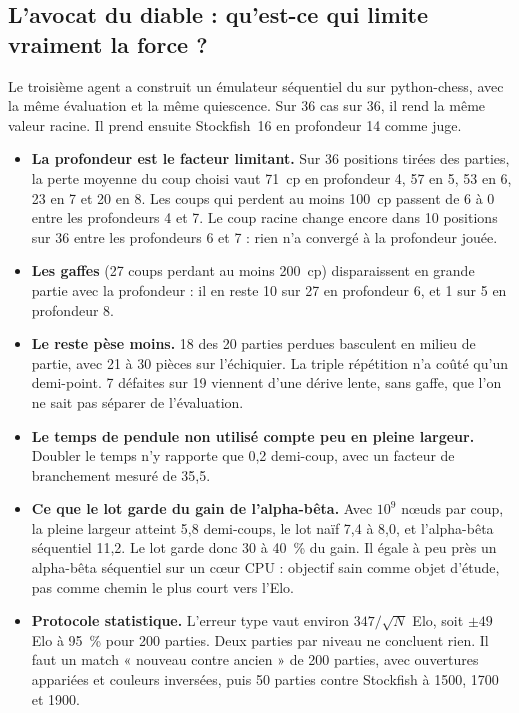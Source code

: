 \subsection*{L'avocat du diable : qu'est-ce qui limite vraiment la force ?}
Le troisième agent a construit un émulateur séquentiel du  sur python-chess, avec
la même évaluation et la même quiescence. Sur 36 cas sur 36, il rend la même valeur racine. Il
prend ensuite Stockfish~16 en profondeur 14 comme juge.
\begin{itemize}
\item \textbf{La profondeur est le facteur limitant.} Sur 36 positions tirées des parties, la
perte moyenne du coup choisi vaut 71~cp en profondeur 4, 57 en 5, 53 en 6, 23 en 7 et 20 en 8.
Les coups qui perdent au moins 100~cp passent de 6 à 0 entre les profondeurs 4 et 7. Le coup racine
change encore dans 10 positions sur 36 entre les profondeurs 6 et 7 : rien n'a convergé à la
profondeur jouée.
\item \textbf{Les gaffes} (27 coups perdant au moins 200~cp) disparaissent en grande partie avec
la profondeur : il en reste 10 sur 27 en profondeur 6, et 1 sur 5 en profondeur 8.
\item \textbf{Le reste pèse moins.} 18 des 20 parties perdues basculent en milieu de partie, avec
21 à 30 pièces sur l'échiquier. La triple répétition n'a coûté qu'un demi-point. 7 défaites sur 19
viennent d'une dérive lente, sans gaffe, que l'on ne sait pas séparer de l'évaluation.
\item \textbf{Le temps de pendule non utilisé compte peu en pleine largeur.} Doubler le temps n'y
rapporte que 0{,}2 demi-coup, avec un facteur de branchement mesuré de 35{,}5.
\item \textbf{Ce que le lot garde du gain de l'alpha-bêta.} Avec $10^9$ nœuds par coup, la pleine
largeur atteint 5{,}8 demi-coups, le lot naïf 7{,}4 à 8{,}0, et l'alpha-bêta séquentiel 11{,}2.
Le lot garde donc 30 à 40~\% du gain. Il égale à peu près un alpha-bêta séquentiel sur un cœur
CPU : objectif sain comme objet d'étude, pas comme chemin le plus court vers l'Elo.
\item \textbf{Protocole statistique.} L'erreur type vaut environ $347/\sqrt N$ Elo, soit $\pm49$
Elo à 95~\% pour 200 parties. Deux parties par niveau ne concluent rien. Il faut un match
« nouveau contre ancien » de 200 parties, avec ouvertures appariées et couleurs inversées, puis
50 parties contre Stockfish à 1500, 1700 et 1900.
\end{itemize}

